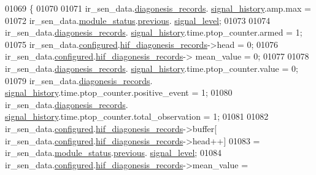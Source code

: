 \begin{DoxyCode}
{{01069          \{
01070 
01071                   ir\_sen\_data.\hyperlink{a00023_a7ae905b560513ad201e58c2f63375030}{diagonesis\_records}.
      \hyperlink{a00017_affb63906d23cb1cb7787d61eaaedfb60}{signal\_history}.amp.max  =
01072                          ir\_sen\_data.\hyperlink{a00023_a5a53c391562b059eb744ac679f3765ca}{module\_status}.\hyperlink{a00017_a0fc6d9ce6203a17f672c19d3d8747aee}{previous}.
      \hyperlink{a00017_abcdf2bc0c2e5a14863938ae28c3bc96e}{signal\_level};
01073 
01074                    ir\_sen\_data.\hyperlink{a00023_a7ae905b560513ad201e58c2f63375030}{diagonesis\_records}.
      \hyperlink{a00017_affb63906d23cb1cb7787d61eaaedfb60}{signal\_history}.time.ptop\_counter.armed              = 1;
01075                    ir\_sen\_data.\hyperlink{a00023_a94b2d1f6ea4ab334c74d24984dd27843}{configured}.\hyperlink{a00021_ae18294f7499d9fcb5ec796a1816b8cd8}{hif\_diagonesis\_records}->head     
                                 = 0;
01076                    ir\_sen\_data.\hyperlink{a00023_a94b2d1f6ea4ab334c74d24984dd27843}{configured}.\hyperlink{a00021_ae18294f7499d9fcb5ec796a1816b8cd8}{hif\_diagonesis\_records}->
      mean\_value                          = 0;
01077 
01078                    ir\_sen\_data.\hyperlink{a00023_a7ae905b560513ad201e58c2f63375030}{diagonesis\_records}.
      \hyperlink{a00017_affb63906d23cb1cb7787d61eaaedfb60}{signal\_history}.time.ptop\_counter.value              = 0;
01079                    ir\_sen\_data.\hyperlink{a00023_a7ae905b560513ad201e58c2f63375030}{diagonesis\_records}.
      \hyperlink{a00017_affb63906d23cb1cb7787d61eaaedfb60}{signal\_history}.time.ptop\_counter.positive\_event     = 1;
01080                    ir\_sen\_data.\hyperlink{a00023_a7ae905b560513ad201e58c2f63375030}{diagonesis\_records}.
      \hyperlink{a00017_affb63906d23cb1cb7787d61eaaedfb60}{signal\_history}.time.ptop\_counter.total\_observation  = 1;
01081 
01082                ir\_sen\_data.\hyperlink{a00023_a94b2d1f6ea4ab334c74d24984dd27843}{configured}.\hyperlink{a00021_ae18294f7499d9fcb5ec796a1816b8cd8}{hif\_diagonesis\_records}->buffer[
      ir\_sen\_data.\hyperlink{a00023_a94b2d1f6ea4ab334c74d24984dd27843}{configured}.\hyperlink{a00021_ae18294f7499d9fcb5ec796a1816b8cd8}{hif\_diagonesis\_records}->head++]
01083                = ir\_sen\_data.\hyperlink{a00023_a5a53c391562b059eb744ac679f3765ca}{module\_status}.\hyperlink{a00017_a0fc6d9ce6203a17f672c19d3d8747aee}{previous}.
      \hyperlink{a00017_abcdf2bc0c2e5a14863938ae28c3bc96e}{signal\_level};
01084                ir\_sen\_data.\hyperlink{a00023_a94b2d1f6ea4ab334c74d24984dd27843}{configured}.\hyperlink{a00021_ae18294f7499d9fcb5ec796a1816b8cd8}{hif\_diagonesis\_records}->mean\_value =
}}
\end{DoxyCode}

